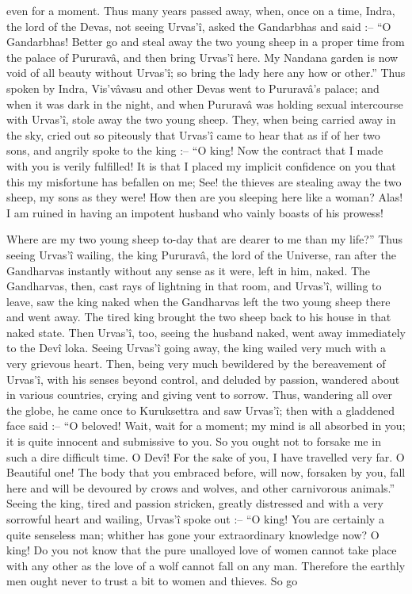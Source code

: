  

even for a moment. Thus many years passed away, when, once on a time, Indra, the lord of the Devas, not seeing Urvas'î, asked the Gandarbhas and said :-- “O Gandarbhas! Better go and steal away the two young sheep in a proper time from the palace of Pururavâ, and then bring Urvas'î here. My Nandana garden is now void of all beauty without Urvas’î; so bring the lady here any how or other.” Thus spoken by Indra, Vis'vâvasu and other Devas went to Pururavâ's palace; and when it was dark in the night, and when Pururavâ was holding sexual intercourse with Urvas’î, stole away the two young sheep. They, when being carried away in the sky, cried out so piteously that Urvas’î came to hear that as if of her two sons, and angrily spoke to the king :-- “O king! Now the contract that I made with you is verily fulfilled! It is that I placed my implicit confidence on you that this my misfortune has befallen on me; See! the thieves are stealing away the two sheep, my sons as they were! How then are you sleeping here like a woman? Alas! I am ruined in having an impotent husband who vainly boasts of his prowess!

 

Where are my two young sheep to-day that are dearer to me than my life?” Thus seeing Urvas’î wailing, the king Pururavâ, the lord of the Universe, ran after the Gandharvas instantly without any sense as it were, left in him, naked. The Gandharvas, then, cast rays of lightning in that room, and Urvas’î, willing to leave, saw the king naked when the Gandharvas left the two young sheep there and went away. The tired king brought the two sheep back to his house in that naked state. Then Urvas’î, too, seeing the husband naked, went away immediately to the Devî loka. Seeing Urvas’î going away, the king wailed very much with a very grievous heart. Then, being very much bewildered by the bereavement of Urvas’î, with his senses beyond control, and deluded by passion, wandered about in various countries, crying and giving vent to sorrow. Thus, wandering all over the globe, he came once to Kuruksettra and saw Urvas’î; then with a gladdened face said :-- “O beloved! Wait, wait for a moment; my mind is all absorbed in you; it is quite innocent and submissive to you. So you ought not to forsake me in such a dire difficult time. O Devî! For the sake of you, I have travelled very far. O Beautiful one! The body that you embraced before, will now, forsaken by you, fall here and will be devoured by crows and wolves, and other carnivorous animals.” Seeing the king, tired and passion stricken, greatly distressed and with a very sorrowful heart and wailing, Urvas’î spoke out :-- “O king! You are certainly a quite senseless man; whither has gone your extraordinary knowledge now? O king! Do you not know that the pure unalloyed love of women cannot take place with any other as the love of a wolf cannot fall on any man. Therefore the earthly men ought never to trust a bit to women and thieves. So go

